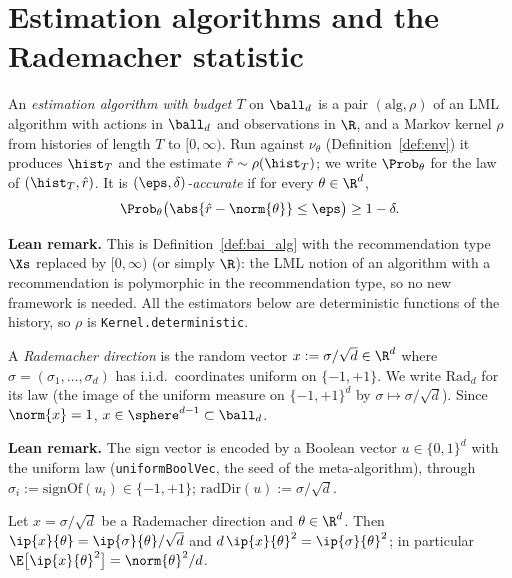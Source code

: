 \section{Estimation algorithms and the Rademacher statistic}
\label{sec:norm_setup}

\begin{definition}\label{def:norm_estimator}
\leanok
{}
An \emph{estimation algorithm with budget $T$} on $\ball_d$ is a pair $(\mathrm{alg}, \rho)$
of an LML algorithm with actions in $\ball_d$ and observations in $\R$, and a Markov kernel
$\rho$ from histories of length $T$ to $[0,\infty)$. Run against $\nu_\theta$
(Definition~\ref{def:env}) it produces $\hist_T$ and the estimate $\hat r \sim \rho(\hist_T)$;
we write $\Prob_\theta$ for the law of $(\hist_T, \hat r)$. It is
\emph{$(\eps,\delta)$-accurate} if for every $\theta \in \R^d$,
\[
  \Prob_\theta\big( \abs{\hat r - \norm{\theta}} \le \eps \big) \ge 1 - \delta .
\]
\end{definition}

\textbf{Lean remark.} This is Definition~\ref{def:bai_alg} with the recommendation type
$\Xs$ replaced by $[0,\infty)$ (or simply $\R$): the LML notion of an algorithm with a
recommendation is polymorphic in the recommendation type, so no new framework is needed.
All the estimators below are deterministic functions of the history, so $\rho$ is
\texttt{Kernel.deterministic}.

\begin{definition}\label{def:rademacher_direction}
\leanok
{}
A \emph{Rademacher direction} is the random vector $x := \sigma/\sqrt d \in \R^d$ where
$\sigma = (\sigma_1, \dots, \sigma_d)$ has i.i.d.\ coordinates uniform on $\{-1, +1\}$. We
write $\mathrm{Rad}_d$ for its law (the image of the uniform measure on $\{-1,+1\}^d$ by
$\sigma \mapsto \sigma/\sqrt d$). Since $\norm{x} = 1$, $x \in \sphere^{d-1} \subset \ball_d$.
\end{definition}

\textbf{Lean remark.} The sign vector is encoded by a Boolean vector $u \in \{0,1\}^d$ with
the uniform law (\texttt{uniformBoolVec}, the seed of the meta-algorithm), through
$\sigma_i := \mathrm{signOf}(u_i) \in \{-1,+1\}$; $\mathrm{radDir}(u) := \sigma/\sqrt d$.

\begin{lemma}\label{lem:direction_second_moment}
\leanok
{}
Let $x = \sigma/\sqrt d$ be a Rademacher direction and $\theta \in \R^d$. Then
$\ip{x}{\theta} = \ip{\sigma}{\theta}/\sqrt d$ and $d\,\ip{x}{\theta}^2 = \ip{\sigma}{\theta}^2$;
in particular $\E\big[\ip{x}{\theta}^2\big] = \norm{\theta}^2/d$.
\end{lemma}

